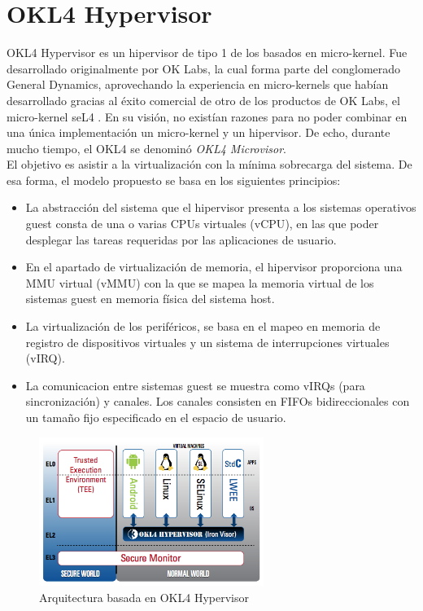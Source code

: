 \section{OKL4 Hypervisor}
OKL4 Hypervisor \cite{okl4} es un hipervisor de tipo 1 de los basados en micro-kernel. Fue desarrollado originalmente por OK Labs, la cual forma parte del conglomerado General Dynamics, aprovechando la experiencia en micro-kernels que habían desarrollado gracias al éxito comercial de otro de los productos de OK Labs, el micro-kernel seL4 \cite{seL4}. En su visión, no existían razones para no poder combinar en una única implementación un micro-kernel y un hipervisor. De echo, durante mucho tiempo, el OKL4 se denominó \textit{OKL4 Microvisor}.\\
El objetivo es asistir a la virtualización con la mínima sobrecarga del sistema. De esa forma, el modelo propuesto se basa en los siguientes principios:
\begin{itemize}
  \item La abstracción del sistema que el hipervisor presenta a los sistemas operativos guest consta de una o varias CPUs virtuales (\acrshort{vCPU}), en las que poder desplegar las tareas requeridas por las aplicaciones de usuario.
  \item En el apartado de virtualización de memoria, el hipervisor proporciona una MMU virtual (\acrshort{vMMU}) con la que se mapea la memoria virtual de los sistemas guest en memoria física del sistema host.
  \item La virtualización de los periféricos, se basa en el mapeo en memoria de registro de dispositivos virtuales y un sistema de interrupciones virtuales (\acrshort{vIRQ}).
  \item La comunicacion entre sistemas guest se muestra como \acrshort{vIRQ}s (para sincronización) y canales. Los canales consisten en FIFOs bidireccionales con un tamaño fijo especificado en el espacio de usuario.
\end{itemize}
\begin{figure}[!htb]
	\centering
	\includegraphics[width=0.65\textwidth]{recursos/OK_L4_Microvisor.png}
	\caption{Arquitectura basada en OKL4 Hypervisor}
	\label{fig:OK_L4_Microvisor}
\end{figure}

